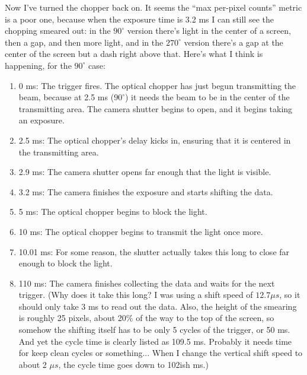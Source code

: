 \documentclass[11pt]{labbook}
\begin{document}
Now I've turned the chopper back on. It seems the ``max per-pixel counts'' metric is a poor one, because when the exposure time is 3.2 ms I can still see the chopping smeared out: in the \(90^\circ\) version there's light in the center of a screen, then a gap, and then more light, and in the \(270^\circ\) version there's a gap at the center of the screen but a dash right above that. Here's what I think is happening, for the \(90^\circ\) case:
\begin{enumerate}
\item 0 ms: The trigger fires. The optical chopper has just begun transmitting the beam, because at 2.5 ms (\(90^\circ\)) it needs the beam to be in the center of the transmitting area. The camera shutter begins to open, and it begins taking an exposure.
\item 2.5 ms: The optical chopper's delay kicks in, ensuring that it is centered in the transmitting area.
\item 2.9 ms: The camera shutter opens far enough that the light is visible.
\item 3.2 ms: The camera finishes the exposure and starts shifting the data.
\item 5 ms: The optical chopper begins to block the light.
\item 10 ms: The optical chopper begins to transmit the light once more.
\item 10.01 ms: For some reason, the shutter actually takes this long to close far enough to block the light.
\item 110 ms: The camera finishes collecting the data and waits for the next trigger. (Why does it take this long? I was using a shift speed of \(12.7 \mu s\), so it should only take 3 ms to read out the data. Also, the height of the smearing is roughly 25 pixels, about 20\% of the way to the top of the screen, so somehow the shifting itself has to be only 5 cycles of the trigger, or 50 ms. And yet the cycle time is clearly listed as 109.5 ms. Probably it needs time for keep clean cycles or something... When I change the vertical shift speed to about 2 \(\mu s\), the cycle time goes down to 102ish ms.)
\end{enumerate}
\end{document}
